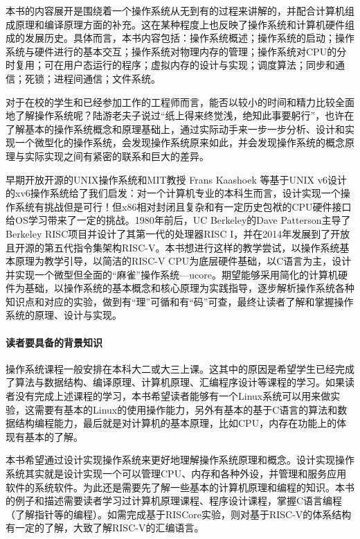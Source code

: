 \documentclass{zhbook}
\begin{document}
本书的内容展开是围绕着一个操作系统从无到有的过程来讲解的，并配合计算机组成原理和编译原理方面的补充。这在某种程度上也反映了操作系统和计算机硬件组成的发展历史。具体而言，本书内容包括：操作系统概述；操作系统的启动；操作系统与硬件进行的基本交互；操作系统对物理内存的管理；操作系统对CPU的分时复用；可在用户态运行的程序；虚拟内存的设计与实现；调度算法；同步和通信；死锁；进程间通信；文件系统。

%
\begin{preface}

对于在校的学生和已经参加工作的工程师而言，能否以较小的时间和精力比较全面地了解操作系统呢？陆游老夫子说过“纸上得来终觉浅，绝知此事要躬行”，也许在了解基本的操作系统概念和原理基础上，通过实际动手来一步一步分析、设计和实现一个微型化的操作系统，会发现操作系统原来如此，并会发现操作系统的概念原理与实际实现之间有紧密的联系和巨大的差异。

早期开放开源的UNIX操作系统和MIT教授 Frans Kaashoek 等基于UNIX v6设计的xv6操作系统给了我们启发：对一个计算机专业的本科生而言，设计实现一个操作系统有挑战但是可行！但x86相对封闭且复杂和有一定历史包袱的CPU硬件接口给OS学习带来了一定的挑战。1980年前后，UC Berkeley的Dave Patterson主导了Berkeley RISC项目并设计了其第一代的处理器RISC I，并在2014年发展到了开放且开源的第五代指令集架构RISC-V。本书想进行这样的教学尝试，以操作系统基本原理为教学引导，以简洁的RISC-V CPU为底层硬件基础，以C语言为主，设计并实现一个微型但全面的“麻雀”操作系统—ucore。期望能够采用简化的计算机硬件为基础，以操作系统的基本概念和核心原理为实践指导，逐步解析操作系统各种知识点和对应的实验，做到有“理”可循和有“码”可查，最终让读者了解和掌握操作系统的原理、设计与实现。

\paragraph{读者要具备的背景知识}
操作系统课程一般安排在本科大二或大三上课。这其中的原因是希望学生已经完成了算法与数据结构、编译原理、计算机原理、汇编程序设计等课程的学习。如果读者没有完成上述课程的学习，本书希望读者能够有一个Linux系统可以用来做实验，这需要有基本的Linux的使用操作能力，另外有基本的基于C语言的算法和数据结构编程能力，最后就是对计算机的基本原理，比如CPU，内存在功能上的体现有基本的了解。

本书希望通过设计实现操作系统来更好地理解操作系统原理和概念。设计实现操作系统其实就是设计实现一个可以管理CPU、内存和各种外设，并管理和服务应用软件的系统软件。为此还是需要先了解一些基本的计算机原理和编程的知识。本书的例子和描述需要读者学习过计算机原理课程、程序设计课程，掌握C语言编程（了解指针等的编程）。如需完成基于RISCore实验，则对基于RISC-V的体系结构有一定的了解，大致了解RISC-V的汇编语言。


\end{preface}
\end{document}
